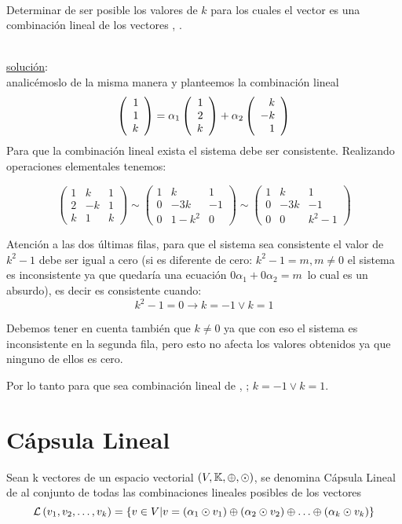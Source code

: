 ~\\
\begin{ejercicio}
Determinar de ser posible los valores de $k$ para los cuales el vector 
 es una combinación lineal de los vectores
 , .
\end{ejercicio}
~\\
\underline{solución}:
\\
analicémoslo de la misma manera y planteemos la combinación lineal
\[
\left( \begin{array}{r} 1\\ 1\\ k \end{array} \right) =
 \alpha_1\left( \begin{array}{r} 1\\ 2\\ k \end{array} \right) +\alpha_2\left( \begin{array}{r} k\\ -k\\ 1 \end{array} \right) 
\]
Para que la combinación lineal exista el sistema debe ser consistente. Realizando operaciones elementales tenemos:

\[
\left(
\begin{array}{rr|r}
1 &k&1\\
2&-k&1\\
k&1&k
\end{array}
\right)
\sim
\left(
\begin{array}{rr|r}
1 &k&1\\
0&-3k&-1\\
0&1-k^2&0
\end{array}
\right)
\sim
\left(
\begin{array}{rr|r}
1 &k&1\\
0&-3k&-1\\
0&0&k^2-1
\end{array}
\right)
\]

Atención a las dos últimas filas, para que el sistema sea consistente el valor de $k^2-1$ debe ser igual a cero (si es diferente de cero: $k^2-1=m, m\neq 0$ el sistema es inconsistente ya que quedar\'ia una ecuación $0\alpha_1+0\alpha_2=m$\, lo cual es un absurdo), es decir es consistente cuando:
\[k^2-1=0  \longrightarrow  k=-1 \vee k=1\]

Debemos tener en cuenta también que $k\neq 0$
ya que con eso el sistema es inconsistente en la
segunda fila, pero esto no afecta los valores obtenidos ya que ninguno de ellos es cero.


Por lo tanto para que  sea combinación lineal de , ; $k=-1 \vee k=1$.

\newpage
\section{Cápsula Lineal}
\begin{dfn}
Sean  k vectores de un espacio vectorial $(V,\mathbb{K},\oplus,\odot)$, se denomina Cápsula Lineal de  al conjunto de todas las combinaciones lineales posibles de los vectores 
\[
\mathcal{L} \left( v_1, v_2, \ldots, v_k\right)=
\lbrace v \in V|v=  \left(\alpha_1 \odot v_1\right)  \oplus
 \left(\alpha_2 \odot v_2\right)  \oplus 
\hdots \oplus
 \left(\alpha_k \odot v_k\right) 
\rbrace
\]

\end{dfn}

